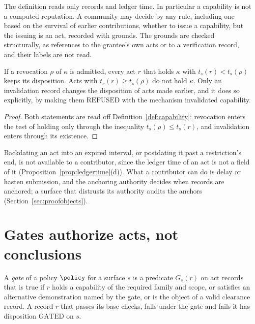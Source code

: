 The definition reads only records and ledger time. In particular a capability is not a computed reputation. A community may decide by any rule, including one based on the survival of earlier contributions, whether to issue a capability, but the issuing is an act, recorded with grounds. The grounds are checked structurally, as references to the grantee's own acts or to a verification record, and their labels are not read.

\begin{proposition}\label{prop:revoke}
If a revocation $\rho$ of $\kappa$ is admitted, every act $r$ that holds $\kappa$ with $t_s(r)<t_s(\rho)$ keeps its disposition. Acts with $t_s(r)\ge t_s(\rho)$ do not hold $\kappa$. Only an invalidation record changes the disposition of acts made earlier, and it does so explicitly, by making them $\mathrm{REFUSED}$ with the mechanism \textsf{invalidated capability}.
\end{proposition}

\begin{proof}
Both statements are read off Definition~\ref{def:capability}: revocation enters the test of holding only through the inequality $t_s(\rho)\le t_s(r)$, and invalidation enters through its existence.
\end{proof}

Backdating an act into an expired interval, or postdating it past a restriction's end, is not available to a contributor, since the ledger time of an act is not a field of it (Proposition~\ref{prop:ledgertime}(d)). What a contributor can do is delay or hasten submission, and the anchoring authority decides when records are anchored; a surface that distrusts its authority audits the anchors (Section~\ref{sec:proofobjects}).

\section{Gates authorize acts, not conclusions}\label{sec:gatesauth}

\begin{definition}[Gate]\label{def:gate}
A \emph{gate} of a policy $\policy$ for a surface $s$ is a predicate $G_s(r)$ on act records that is true if $r$ holds a capability of the required family and scope, or satisfies an alternative demonstration named by the gate, or is the object of a valid clearance record. A record $r$ that passes its base checks, falls under the gate and fails it has disposition $\mathrm{GATED}$ on $s$.
\end{definition}

